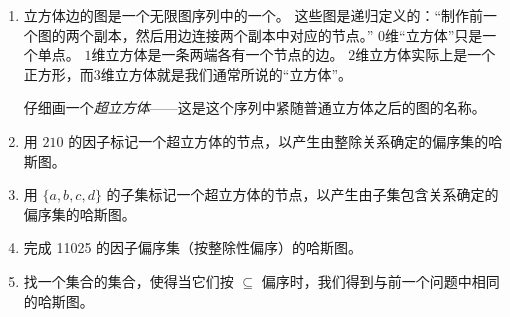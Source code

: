 \begin{enumerate}
    \wbvfill
    
    \workbookpagebreak
    
    \item 立方体边的图是一个无限图序列中的一个。
    这些图是递归定义的：“制作前一个图的两个副本，然后用边连接两个副本中对应的节点。” $0$维“立方体”只是一个单点。
    $1$维立方体是一条两端各有一个节点的边。
    $2$维立方体实际上是一个正方形，而$3$维立方体就是我们通常所说的“立方体”。
    
    \begin{center}
    
    \end{center}
    
    仔细画一个\emph{超立方体}——这是这个序列中紧随普通立方体之后的图的名称。
    
    \wbvfill
    
    \workbookpagebreak
    
    \item 用 $210$ 的因子标记一个超立方体的节点，以产生由整除关系确定的偏序集的哈斯图。
    
    \wbvfill
    
    
    \item 用 $\{a,b,c,d\}$ 的子集标记一个超立方体的节点，以产生由子集包含关系确定的偏序集的哈斯图。
    
    \wbvfill
    
    \workbookpagebreak
    
    \item 完成 11025 的因子偏序集（按整除性偏序）的哈斯图。
    
    \wbvfill
    
    
    \item 找一个集合的集合，使得当它们按 $\subseteq$ 偏序时，我们得到与前一个问题中相同的哈斯图。
    
    \wbvfill
    
    \workbookpagebreak
    
    
    \end{enumerate}
    
